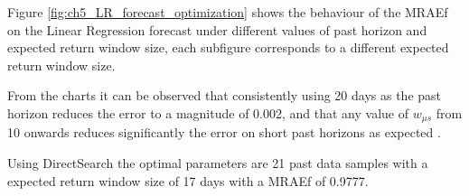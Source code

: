 Figure \ref{fig:ch5_LR_forecast_optimization} shows the behaviour of the \ac{MRAE}f on the Linear Regression forecast under different values of past horizon and expected return window size, each subfigure corresponds to a different expected return window size. 

From the charts it can be observed that consistently using 20 days as the past horizon reduces the error to a magnitude of 0.002, and that any value of $w_{\mu{}s}$ from 10 onwards reduces significantly the error on short past horizons as expected .

Using DirectSearch\cite{DirectSearch.jl} the optimal parameters are 21 past data samples with a expected return window size of 17 days with a \ac{MRAE}f of 0.9777.

